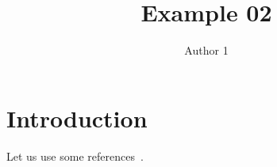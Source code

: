 \documentclass{article}
\title{Example 02}
\author{Author 1}
\begin{document}
\maketitle

\section{Introduction}
Let us use some references~\cite{Jackson_1998aa,Moore_1965aa}.


\end{document}
